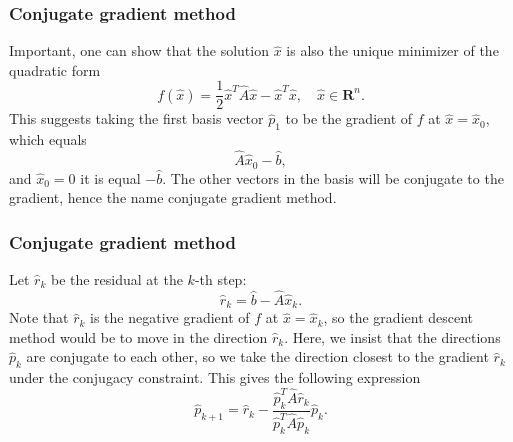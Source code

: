 \documentclass{beamer}
\begin{document}
\begin{frame}
\frametitle{Conjugate gradient method}

\begin{block}{}
Important, one can show that the solution $\hat{x}$ is also the unique minimizer of the quadratic form
\begin{equation*}
  f(\hat{x}) = \frac{1}{2}\hat{x}^T\hat{A}\hat{x} - \hat{x}^T \hat{x} , \quad \hat{x}\in\mathbf{R}^n. 
\end{equation*}
This suggests taking the first basis vector $\hat{p}_1$ 
to be the gradient of $f$ at $\hat{x}=\hat{x}_0$, 
which equals
\begin{equation*}
\hat{A}\hat{x}_0-\hat{b},
\end{equation*}
and 
$\hat{x}_0=0$ it is equal $-\hat{b}$.
The other vectors in the basis will be conjugate to the gradient, 
hence the name conjugate gradient method.
\end{block}
\end{frame}

\begin{frame}
\frametitle{Conjugate gradient method}

\begin{block}{}
Let  $\hat{r}_k$ be the residual at the $k$-th step:
\begin{equation*}
\hat{r}_k=\hat{b}-\hat{A}\hat{x}_k.
\end{equation*}
Note that $\hat{r}_k$ is the negative gradient of $f$ at 
$\hat{x}=\hat{x}_k$, 
so the gradient descent method would be to move in the direction $\hat{r}_k$. 
Here, we insist that the directions $\hat{p}_k$ are conjugate to each other, 
so we take the direction closest to the gradient $\hat{r}_k$  
under the conjugacy constraint. 
This gives the following expression
\begin{equation*}
\hat{p}_{k+1}=\hat{r}_k-\frac{\hat{p}_k^T \hat{A}\hat{r}_k}{\hat{p}_k^T\hat{A}\hat{p}_k} \hat{p}_k.
\end{equation*}
\end{block}
\end{frame}
\end{document}
